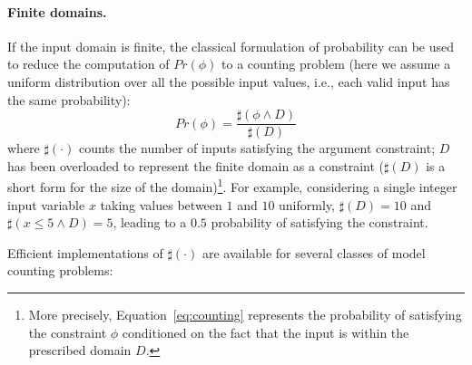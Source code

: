 \paragraph{Finite domains.} 

If the input domain is finite, the classical formulation of probability can be used to reduce the computation of $Pr(\phi)$ to a counting problem (here we assume a uniform distribution over all the possible input values, i.e., each valid input has the same probability):
%
\begin{equation}\label{eq:counting}
	Pr(\phi) = \frac{\sharp(\phi \land D)}{\sharp(D)}
\end{equation}
%
\noindent where $\sharp(\cdot)$ counts the number of inputs satisfying the argument constraint; $D$ has been overloaded to represent the finite domain as a constraint ($\sharp(D)$ is a short form for the size of the domain)\footnote{More precisely, Equation~\eqref{eq:counting} represents the probability of satisfying the constraint $\phi$ conditioned on the fact that the input is within the prescribed domain $D$.}. For example, considering a single integer input variable $x$ taking values between $1$ and $10$ uniformly, $\sharp(D)=10$ and $\sharp(x\leq5 \land D)=5$, leading to a $0.5$ probability of satisfying the constraint.

Efficient implementations of $\sharp(\cdot)$ are available for several classes of model counting problems:

